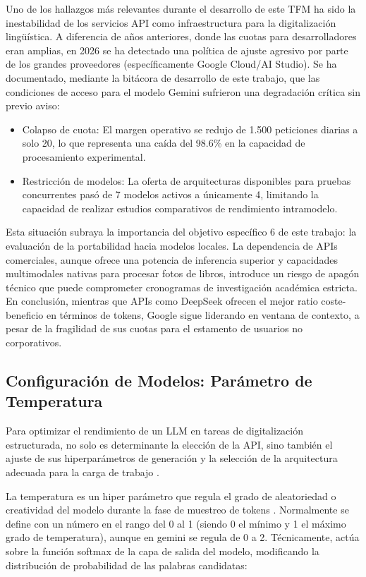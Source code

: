 Uno de los hallazgos más relevantes durante el desarrollo de este TFM ha sido la inestabilidad de los servicios API como infraestructura para la digitalización lingüística. A diferencia de años anteriores, donde las cuotas para desarrolladores eran amplias, en 2026 se ha detectado una política de ajuste agresivo por parte de los grandes proveedores (específicamente Google Cloud/AI Studio).
Se ha documentado, mediante la bitácora de desarrollo de este trabajo, que las condiciones de acceso para el modelo Gemini sufrieron una degradación crítica sin previo aviso:

\begin{itemize}
    \item Colapso de cuota: El margen operativo se redujo de 1.500 peticiones diarias a solo 20, lo que representa una caída del 98.6\% en la capacidad de procesamiento experimental.
    \item Restricción de modelos: La oferta de arquitecturas disponibles para pruebas concurrentes pasó de 7 modelos activos a únicamente 4, limitando la capacidad de realizar estudios comparativos de rendimiento intramodelo.
\end{itemize}

Esta situación subraya la importancia del objetivo específico 6 de este trabajo: la evaluación de la portabilidad hacia modelos locales. La dependencia de APIs comerciales, aunque ofrece una potencia de inferencia superior y capacidades multimodales nativas para procesar fotos de libros, introduce un riesgo de apagón técnico que puede comprometer cronogramas de investigación académica estricta.
En conclusión, mientras que APIs como DeepSeek ofrecen el mejor ratio coste-beneficio en términos de tokens, Google sigue liderando en ventana de contexto, a pesar de la fragilidad de sus cuotas para el estamento de usuarios no corporativos.

\subsection{Configuración de Modelos: Parámetro de Temperatura}

Para optimizar el rendimiento de un LLM en tareas de digitalización estructurada, no solo es determinante la elección de la API, sino también el ajuste de sus hiperparámetros de generación y la selección de la arquitectura adecuada para la carga de trabajo \parencite{halfon2024staytunedempiricalstudy}.

La temperatura es un hiper parámetro que regula el grado de aleatoriedad o creatividad del modelo durante la fase de muestreo de tokens \parencite{peeperkorn2024temperaturecreativityparameterlarge}. Normalmente se define con un número en el rango del 0 al 1 (siendo 0 el mínimo y 1 el máximo grado de temperatura), aunque en gemini se regula de 0 a 2. Técnicamente, actúa sobre la función softmax de la capa de salida del modelo, modificando la distribución de probabilidad de las palabras candidatas:

